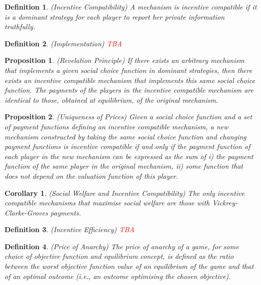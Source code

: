\documentclass{article}
\newtheorem{proposition}{Proposition}
\newtheorem{definition}{Definition}
\newtheorem{corollary}{Corollary}
\begin{document}
\begin{definition}
(Incentive Compatibility) A mechanism is incentive compatible if it is a dominant strategy for each player to report her private information truthfully.
\end{definition}

\begin{definition}
(Implementation) \textcolor{red}{TBA}
\end{definition}

\begin{proposition}
(Revelation Principle) If there exists an arbitrary mechanism that implements a given social choice function in dominant strategies, then there exists an incentive compatible mechanism that implements this same social choice function. The payments of the players in the incentive compatible mechanism are identical to those, obtained at equilibrium, of the original mechanism.
\end{proposition}

\begin{proposition}
(Uniqueness of Prices) Given a social choice function and a set of payment functions defining an incentive compatible mechanism, a new mechanism constructed by taking the same social choice function and changing payment functions is incentive compatible if and only if the payment function of each player in the new mechanism can be expressed as the sum of i) the payment function of the same player in the original mechanism, ii) some function that does not depend on the valuation function of this player.
\end{proposition}

\begin{corollary}
(Social Welfare and Incentive Compatibility) The only incentive compatible mechanisms that maximise social welfare are those with Vickrey-Clarke-Groves payments.
\end{corollary}

\begin{definition}
(Incentive Efficiency) \textcolor{red}{TBA}
\end{definition}

\begin{definition}
(Price of Anarchy) The price of anarchy of a game, for some choice of objective function and equilibrium concept, is defined as the ratio between the worst objective function value of an equilibrium of the game and that of an optimal outcome (i.e., an outcome optimising the chosen objective).
\end{definition}
\end{document}
